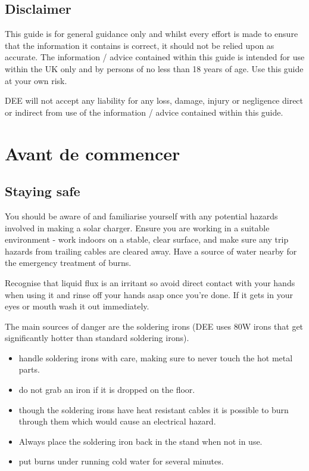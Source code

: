 \documentclass{article}
\theoremstyle{definition}
\theoremstyle{definition}
\theoremstyle{remark}
\begin{document}
  
  {\color{blue}\subsection{Disclaimer}} %
  \label{sub:disclaimer}

    This guide is for general guidance only and whilst every effort is made to ensure that the information it contains is correct, it should not be relied upon as accurate. The information / advice contained within this guide is intended for use within the UK only and by persons of no less than 18 years of age. Use this guide at your own risk.
    
    DEE will not accept any liability for any loss, damage, injury or negligence direct or indirect from use of the information / advice contained within this guide.


  \newpage  


{\color{blue}\section{Avant de commencer}} %
\label{sec:avant_de_commencer}

  {\color{blue}\subsection{Staying safe}} %
  \label{sub:staying_safe}

    You should be aware of and familiarise yourself with any potential hazards involved in making a solar charger. Ensure you are working in a suitable environment - work indoors on a stable, clear surface, and make sure any trip hazards from trailing cables are cleared away. Have a source of water nearby for the emergency treatment of burns.

    Recognise that liquid flux is an irritant so avoid direct contact with your hands when using it and rinse off your hands asap once you’re done. If it gets in your eyes or mouth wash it out immediately.

    The main sources of danger are the soldering irons (DEE uses 80W irons that get significantly hotter than standard soldering irons). 

    \begin{itemize}
      \item handle soldering irons with care, making sure to never touch the hot metal parts. 
      \item do not grab an iron if it is dropped on the floor. 
      \item though the soldering irons have heat resistant cables it is possible to burn through them which would cause an electrical hazard.
      \item Always place the soldering iron back in the stand when not in use.
      \item put burns under running cold water for several minutes. 
    \end{itemize}
\end{document}
